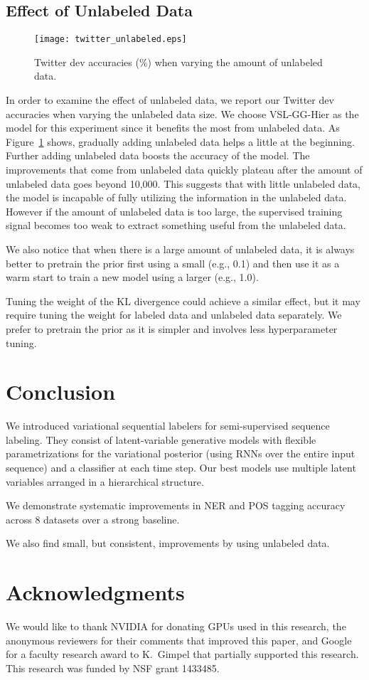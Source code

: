 \documentclass[11pt,a4paper]{article}
\newcommand{\vsmgghier}{VSL-GG-Hier\xspace}
\begin{document}
\subsection{Effect of Unlabeled Data}

\begin{figure}[t]
    \centering
    \texttt{[image: twitter\_unlabeled.eps]}
\caption{Twitter dev accuracies (\%) when varying the amount of unlabeled data.}
\label{fig:unlabeled}
\end{figure}
In order to examine the effect of unlabeled data, we report our Twitter dev accuracies when varying the unlabeled data size. We choose \vsmgghier as the model for this experiment since it benefits the most from unlabeled data. As Figure~\ref{fig:unlabeled} shows, gradually adding unlabeled data helps a little at the beginning. Further adding unlabeled data boosts the accuracy of the model.
The improvements that come from unlabeled data quickly plateau after the amount of unlabeled data goes beyond 10,000. This suggests that with little unlabeled data, the model is incapable of fully utilizing the information in the unlabeled data. However if the amount of unlabeled data is too large, the supervised training signal becomes too weak to extract something useful from the unlabeled data.

We also notice that when there is a large amount of unlabeled data, it is always better to pretrain the prior first using a small  (e.g., 0.1) and then use it as a warm start to train a new model using a larger  (e.g., 1.0).

Tuning the weight of the KL divergence could achieve a similar effect, but it may require tuning the weight for labeled data and unlabeled data separately. We prefer to pretrain the prior as it is simpler and involves less hyperparameter tuning.

\section{Conclusion}

We introduced variational sequential labelers for semi-supervised sequence labeling. They consist of  latent-variable generative models with flexible parametrizations for the variational posterior (using RNNs over the entire input sequence) and a classifier at each time step.  Our best models use multiple latent variables arranged in a hierarchical structure.

We demonstrate systematic improvements in NER and POS tagging accuracy across 8 datasets over a strong baseline.

We also find small, but consistent, improvements by using unlabeled data.


\section*{Acknowledgments}
We would like to thank NVIDIA for donating GPUs used in this research, the anonymous reviewers for their comments that improved this paper, and Google for a faculty research award to K.~Gimpel that partially supported this research.
This research was funded by NSF grant 1433485.



\end{document}
